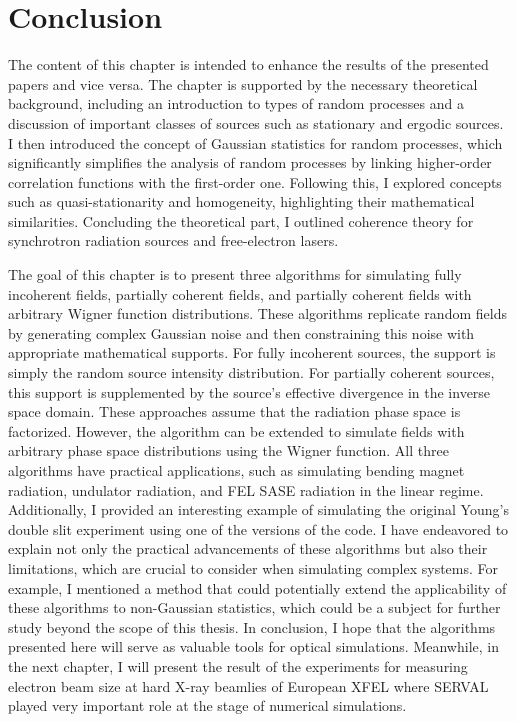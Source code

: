 

\section{Conclusion}

    The content of this chapter is intended to enhance the results of the presented papers and vice versa. The chapter is supported by the necessary theoretical background, including an introduction to types of random processes and a discussion of important classes of sources such as stationary and ergodic sources. I then introduced the concept of Gaussian statistics for random processes, which significantly simplifies the analysis of random processes by linking higher-order correlation functions with the first-order one. Following this, I explored concepts such as quasi-stationarity and homogeneity, highlighting their mathematical similarities. Concluding the theoretical part, I outlined coherence theory for synchrotron radiation sources and free-electron lasers.

    
    The goal of this chapter is to present three algorithms for simulating fully incoherent fields, partially coherent fields, and partially coherent fields with arbitrary Wigner function distributions. These algorithms replicate  random fields by generating complex Gaussian noise and then constraining this noise with appropriate mathematical supports. For fully incoherent sources, the support is simply the random source intensity distribution. For partially coherent sources, this support is supplemented by the source's effective divergence in the inverse space domain. These approaches assume that the radiation phase space is factorized. However, the algorithm can be extended to simulate fields with arbitrary phase space distributions using the Wigner function. All three algorithms have practical applications, such as simulating bending magnet radiation, undulator radiation, and FEL SASE radiation in the linear regime. Additionally, I provided an interesting example of simulating the original Young's double slit experiment using one of the versions of the code. I have endeavored to explain not only the practical advancements of these algorithms but also their limitations, which are crucial to consider when simulating complex systems. For example, I mentioned a method that could potentially extend the applicability of these algorithms to non-Gaussian statistics, which could be a subject for further study beyond the scope of this thesis. In conclusion, I hope that the algorithms presented here will serve as valuable tools for optical simulations. Meanwhile, in the next chapter, I will present the result of the experiments for measuring electron beam size at hard X-ray beamlies of European XFEL where SERVAL played very important role at the stage of numerical simulations.
